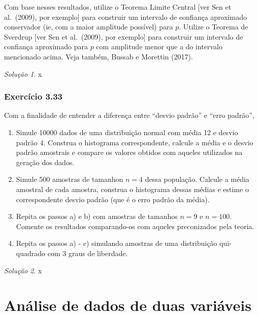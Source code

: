 \documentclass[
]{latex/krantz}
\providecommand{\tightlist}{%
  \setlength{\itemsep}{0pt}\setlength{\parskip}{0pt}}
\theoremstyle{definition}
\theoremstyle{definition}
\theoremstyle{definition}
\theoremstyle{definition}
\theoremstyle{remark}
\newtheorem*{solution}{Solução}
\begin{document}
Com base nesses resultados, utilize o Teorema Limite Central {[}ver Sen et al.~(2009), por exemplo{]} para construir um intervalo de confiança aproximado conservador (ie, com a maior amplitude possível) para \(p\). Utilize o Teorema de Sverdrup {[}ver Sen et al.~(2009), por exemplo{]} para construir um intervalo de confiança aproximado para \(p\) com amplitude menor que a do intervalo mencionado acima. Veja também, Bussab e Morettin (2017).

\begin{solution}
x
\end{solution}

\hypertarget{exr3-33}{%
\subsection*{Exercício 3.33}\label{exr3-33}}

Com a finalidade de entender a diferença entre ``desvio padrão'' e ``erro padrão'',

\begin{enumerate}
\def\labelenumi{\alph{enumi})}
\tightlist
\item
  Simule 10000 dados de uma distribuição normal com média 12 e desvio padrão 4. Construa o histograma correspondente, calcule a média e o desvio padrão amostrais e compare os valores obtidos com aqueles utilizados na geração dos dados.
\item
  Simule 500 amostras de tamanhon \(n = 4\) dessa população. Calcule a média amostral de cada amostra, construa o histograma dessas médias e estime o correspondente desvio padrão (que é o erro padrão da média).
\item
  Repita os passos a) e b) com amostras de tamanhos \(n = 9\) e \(n = 100\). Comente os resultados comparando-os com aqueles preconizados pela teoria.
\item
  Repita os passos a) - c) simulando amostras de uma distribuição qui-quadrado com 3 graus de liberdade.
\end{enumerate}

\begin{solution}
x
\end{solution}

\hypertarget{anuxe1lise-de-dados-de-duas-variuxe1veis}{%
\chapter{Análise de dados de duas variáveis}\label{anuxe1lise-de-dados-de-duas-variuxe1veis}}
\end{document}
